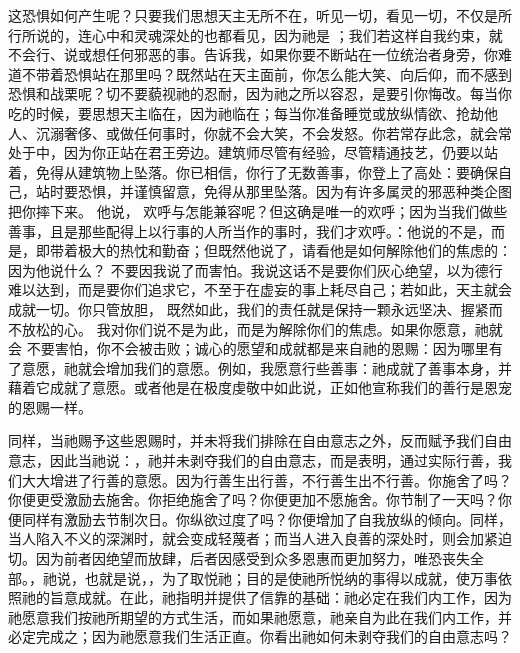 这恐惧如何产生呢？只要我们思想天主无所不在，听见一切，看见一切，不仅是所行所说的，连心中和灵魂深处的也都看见，因为祂是 ；我们若这样自我约束，就不会行、说或想任何邪恶的事。告诉我，如果你要不断站在一位统治者身旁，你难道不带着恐惧站在那里吗？既然站在天主面前，你怎么能大笑、向后仰，而不感到恐惧和战栗呢？切不要藐视祂的忍耐，因为祂之所以容忍，是要引你悔改。每当你吃的时候，要思想天主临在，因为祂临在；每当你准备睡觉或放纵情欲、抢劫他人、沉溺奢侈、或做任何事时，你就不会大笑，不会发怒。你若常存此念，就会常处于中，因为你正站在君王旁边。建筑师尽管有经验，尽管精通技艺，仍要以站着，免得从建筑物上坠落。你已相信，你行了无数善事，你登上了高处：要确保自己，站时要恐惧，并谨慎留意，免得从那里坠落。因为有许多属灵的邪恶种类企图把你摔下来。 他说，  欢呼与怎能兼容呢？但这确是唯一的欢呼；因为当我们做些善事，且是那些配得上以行事的人所当作的事时，我们才欢呼。：他说的不是，而是，即带着极大的热忱和勤奋；但既然他说了，请看他是如何解除他们的焦虑的：因为他说什么？ 不要因我说了而害怕。我说这话不是要你们灰心绝望，以为德行难以达到，而是要你们追求它，不至于在虚妄的事上耗尽自己；若如此，天主就会成就一切。你只管放胆， 既然如此，我们的责任就是保持一颗永远坚决、握紧而不放松的心。  我对你们说不是为此，而是为解除你们的焦虑。如果你愿意，祂就会 不要害怕，你不会被击败；诚心的愿望和成就都是来自祂的恩赐：因为哪里有了意愿，祂就会增加我们的意愿。例如，我愿意行些善事：祂成就了善事本身，并藉着它成就了意愿。或者他是在极度虔敬中如此说，正如他宣称我们的善行是恩宠的恩赐一样。\par

同样，当祂赐予这些恩赐时，并未将我们排除在自由意志之外，反而赋予我们自由意志，因此当祂说：，祂并未剥夺我们的自由意志，而是表明，通过实际行善，我们大大增进了行善的意愿。因为行善生出行善，不行善生出不行善。你施舍了吗？你便更受激励去施舍。你拒绝施舍了吗？你便更加不愿施舍。你节制了一天吗？你便同样有激励去节制次日。你纵欲过度了吗？你便增加了自我放纵的倾向。同样，当人陷入不义的深渊时，就会变成轻蔑者；而当人进入良善的深处时，则会加紧迫切。因为前者因绝望而放肆，后者因感受到众多恩惠而更加努力，唯恐丧失全部。，祂说，也就是说，，为了取悦祂；目的是使祂所悦纳的事得以成就，使万事依照祂的旨意成就。在此，祂指明并提供了信靠的基础：祂必定在我们内工作，因为祂愿意我们按祂所期望的方式生活，而如果祂愿意，祂亲自为此在我们内工作，并必定完成之；因为祂愿意我们生活正直。你看出祂如何未剥夺我们的自由意志吗？\par

